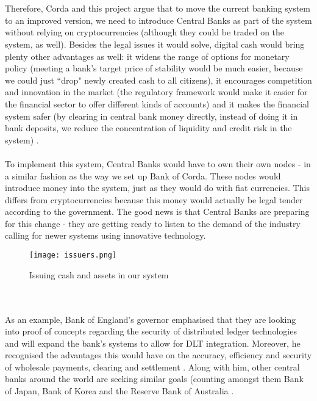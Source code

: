 \documentclass[12pt,twoside]{article}
\begin{document}
\\ \\
Therefore, Corda and this project argue that to move the current banking system to an improved version, we need to introduce Central Banks as part of the system without relying on cryptocurrencies (although they could be traded on the system, as well). Besides the legal issues it would solve, digital cash would bring plenty other advantages as well: it widens the range of options for monetary policy (meeting a bank's target price of stability would be much easier, because we could just ``drop" newly created cash to all citizens), it encourages competition and innovation in the market (the regulatory framework would make it easier for the financial sector to offer different kinds of accounts) and it makes the financial system safer (by clearing in central bank money directly, instead of doing it in bank deposits, we reduce the concentration of liquidity and credit risk in the system) \cite{digcash}.
\\ \\
To implement this system, Central Banks would have to own their own nodes - in a similar fashion as the way we set up Bank of Corda. These nodes would introduce money into the system, just as they would do with fiat currencies. This differs from cryptocurrencies because this money would actually be legal tender according to the government. The good news is that Central Banks are preparing for this change - they are getting ready to listen to the demand of the industry calling for newer systems using innovative technology. 
\\
\begin{figure}[!htb]
\centering
\texttt{[image: issuers.png]}
\caption{Issuing cash and assets in our system}
\centering
\label{fig:issuers}
\end{figure}
\\ \\
As an example, Bank of England's governor emphasised that they are looking into proof of concepts regarding the security of distributed ledger technologies and will expand the bank's systems to allow for DLT integration. Moreover, he recognised the advantages this would have on the accuracy, efficiency and security of wholesale payments, clearing and settlement \cite{markc}. Along with him, other central banks around the world are seeking similar goals (counting amongst them Bank of Japan, Bank of Korea and the Reserve Bank of Australia \cite{centralbanks}. 
\\ \\
\end{document}
